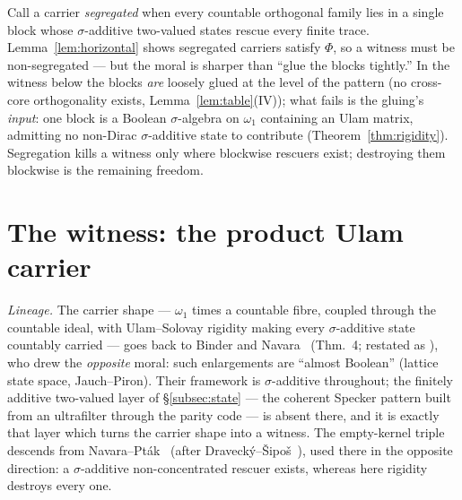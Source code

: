 \begin{remark}\label{rem:segregated}
Call a carrier \emph{segregated} when every countable orthogonal family lies in a
single block whose $\sigma$-additive two-valued states rescue every finite trace.
Lemma~\ref{lem:horizontal} shows segregated carriers satisfy $\Phi$, so a witness
must be non-segregated --- but the moral is sharper than ``glue the blocks
tightly.'' In the witness below the blocks \emph{are} loosely glued at the level
of the pattern (no cross-core orthogonality exists,
Lemma~\ref{lem:table}(IV)); what fails is the gluing's \emph{input}: one block is
a Boolean $\sigma$-algebra on $\omega_1$ containing an Ulam matrix, admitting no
non-Dirac $\sigma$-additive state to contribute (Theorem~\ref{thm:rigidity}).
Segregation kills a witness only where blockwise rescuers exist; destroying them
blockwise is the remaining freedom.
\end{remark}


\section{The witness: the product Ulam carrier}\label{sec:witness}

\emph{Lineage.} The carrier shape --- $\omega_1$ times a countable fibre, coupled
through the countable ideal, with Ulam--Solovay rigidity making every
$\sigma$-additive state countably carried --- goes back to Binder and
Navara~\cite{BinderNavara1987} (Thm.~4; restated as \cite[Thm.~17.4]{Navara2000}),
who drew the \emph{opposite} moral: such enlargements are ``almost Boolean''
(lattice state space, Jauch--Piron). Their framework is $\sigma$-additive
throughout; the finitely additive two-valued layer of \S\ref{subsec:state} --- the
coherent Specker pattern built from an ultrafilter through the parity code --- is
absent there, and it is exactly that layer which turns the carrier shape into a
witness. The empty-kernel triple descends from Navara--Pt\'ak~\cite{NavaraPtak1983}
(after Draveck\'y--\v{S}ipo\v{s}~\cite{DraveckySipos1980}), used there in the
opposite direction: a $\sigma$-additive non-concentrated rescuer exists, whereas
here rigidity destroys every one.

